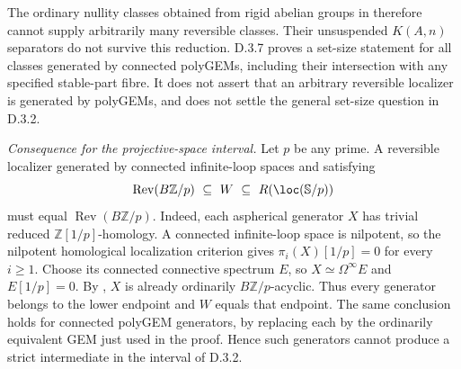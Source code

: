 The ordinary nullity classes obtained from rigid abelian groups in
\citet[Theorems~8.2 and~8.5]{FGHStanley2006} therefore cannot supply
arbitrarily many reversible classes.  Their unsuspended
$K(A,n)$ separators do not survive this reduction.  D.3.7 proves a
set-size statement for all classes generated by connected polyGEMs,
including their intersection with any specified stable-part fibre.
It does not assert that an arbitrary reversible localizer is
generated by polyGEMs, and does not settle the general set-size question
in D.3.2.

\medskip\noindent
\emph{Consequence for the projective-space interval.}
Let $p$ be any prime.  A reversible localizer generated by connected
infinite-loop spaces and satisfying
\[
 \operatorname{Rev}(B\mathbb Z/p)\ \subseteq\ W
          \ \subseteq\ R(\loc(\mathbb S/p))
\]
must equal $\operatorname{Rev}(B\mathbb Z/p)$.  Indeed, each
aspherical generator $X$ has trivial reduced
$\mathbb Z[1/p]$-homology.  A connected infinite-loop space is
nilpotent, so the nilpotent homological localization criterion
\citep[Theorems~6.1.1--6.1.2]{FGHMayPonto2012} gives
$\pi_i(X)[1/p]=0$ for every $i\geq1$.  Choose its connected
connective spectrum $E$, so $X\simeq\Omega^\infty E$ and
$E[1/p]=0$.  By \citet[Theorem~3.2]{EH5Levy2025}, $X$ is already
ordinarily $B\mathbb Z/p$-acyclic.  Thus every generator belongs
to the lower endpoint and $W$ equals that endpoint.  The same
conclusion holds for connected polyGEM generators, by replacing
each by the ordinarily equivalent GEM just used in the proof.
Hence such generators cannot produce a strict intermediate in
the interval of D.3.2.

